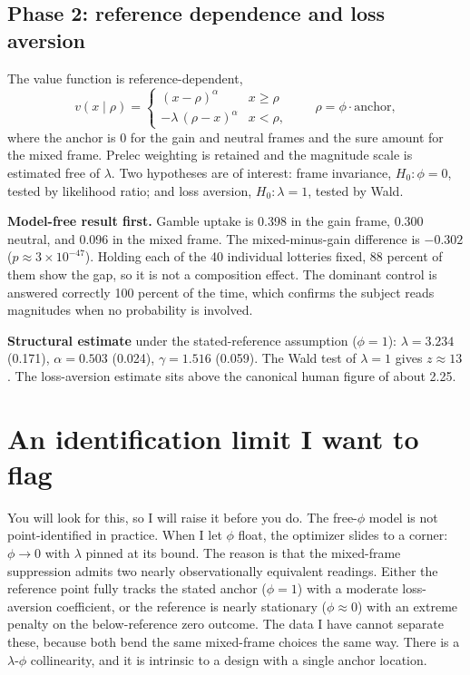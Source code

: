 \documentclass[11pt]{article}
\begin{document}
\subsection{Phase 2: reference dependence and loss aversion}

The value function is reference-dependent,
\[
  v(x \mid \rho) =
  \begin{cases}
    (x - \rho)^{\alpha} & x \ge \rho \\[2pt]
    -\lambda\,(\rho - x)^{\alpha} & x < \rho,
  \end{cases}
  \qquad \rho = \phi \cdot \text{anchor},
\]
where the anchor is 0 for the gain and neutral frames and the sure amount for the mixed frame.
Prelec weighting is retained and the magnitude scale is estimated free of $\lambda$. Two hypotheses
are of interest: frame invariance, $H_0: \phi = 0$, tested by likelihood ratio; and loss aversion,
$H_0: \lambda = 1$, tested by Wald.

\textbf{Model-free result first.} Gamble uptake is 0.398 in the gain frame, 0.300 neutral, and
0.096 in the mixed frame. The mixed-minus-gain difference is $-0.302$ ($p \approx 3 \times
10^{-47}$). Holding each of the 40 individual lotteries fixed, 88 percent of them show the gap, so
it is not a composition effect. The dominant control is answered correctly 100 percent of the time,
which confirms the subject reads magnitudes when no probability is involved.

\textbf{Structural estimate} under the stated-reference assumption ($\phi = 1$): $\lambda = 3.234$
(0.171), $\alpha = 0.503$ (0.024), $\gamma = 1.516$ (0.059). The Wald test of $\lambda = 1$ gives
$z \approx 13$. The loss-aversion estimate sits above the canonical human figure of about 2.25.

\section{An identification limit I want to flag}

You will look for this, so I will raise it before you do. The free-$\phi$ model is not
point-identified in practice. When I let $\phi$ float, the optimizer slides to a corner: $\phi
\rightarrow 0$ with $\lambda$ pinned at its bound. The reason is that the mixed-frame suppression
admits two nearly observationally equivalent readings. Either the reference point fully tracks the
stated anchor ($\phi = 1$) with a moderate loss-aversion coefficient, or the reference is nearly
stationary ($\phi \approx 0$) with an extreme penalty on the below-reference zero outcome. The data
I have cannot separate these, because both bend the same mixed-frame choices the same way. There is
a $\lambda$-$\phi$ collinearity, and it is intrinsic to a design with a single anchor location.
\end{document}
